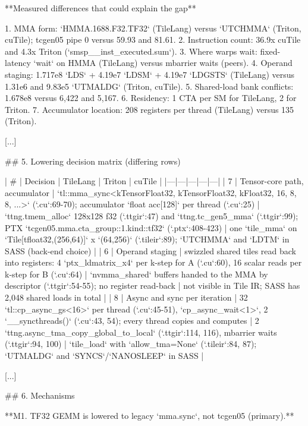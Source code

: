 \begin{promptbox}

**Measured differences that could explain the gap**

1. MMA form: `HMMA.1688.F32.TF32` (TileLang) versus `UTCHMMA` (Triton, cuTile); tcgen05 pipe 0 versus 59.93 and 81.61.
2. Instruction count: 36.9x cuTile and 4.3x Triton (`smsp__inst_executed.sum`).
3. Where warps wait: fixed-latency `wait` on HMMA (TileLang) versus mbarrier waits (peers).
4. Operand staging: 1.717e8 `LDS` + 4.19e7 `LDSM` + 4.19e7 `LDGSTS` (TileLang) versus 1.31e6 and 9.83e5 `UTMALDG` (Triton, cuTile).
5. Shared-load bank conflicts: 1.678e8 versus 6,422 and 5,167.
6. Residency: 1 CTA per SM for TileLang, 2 for Triton.
7. Accumulator location: 208 registers per thread (TileLang) versus 135 (Triton).

[...]

## 5. Lowering decision matrix (differing rows)

| # | Decision | TileLang | Triton | cuTile |
|---|---|---|---|---|
| 7 | Tensor-core path, accumulator | `tl::mma_sync<kTensorFloat32, kTensorFloat32, kFloat32, 16, 8, 8, ...>` (`.cu`:69-70); accumulator `float acc[128]` per thread (`.cu`:25) | `ttng.tmem_alloc` 128x128 f32 (`.ttgir`:47) and `ttng.tc_gen5_mma` (`.ttgir`:99); PTX `tcgen05.mma.cta_group::1.kind::tf32` (`.ptx`:408-423) | one `tile_mma` on `Tile[tfloat32,(256,64)]` x `(64,256)` (`.tileir`:89); `UTCHMMA` and `LDTM` in SASS (back-end choice) |
| 6 | Operand staging | swizzled shared tiles read back into registers: 4 `ptx_ldmatrix_x4` per k-step for A (`.cu`:60), 16 scalar reads per k-step for B (`.cu`:64) | `nvmma_shared` buffers handed to the MMA by descriptor (`.ttgir`:54-55); no register read-back | not visible in Tile IR; SASS has 2,048 shared loads in total |
| 8 | Async and sync per iteration | 32 `tl::cp_async_gs<16>` per thread (`.cu`:45-51), `cp_async_wait<1>`, 2 `__syncthreads()` (`.cu`:43, 54); every thread copies and computes | 2 `ttng.async_tma_copy_global_to_local` (`.ttgir`:114, 116), mbarrier waits (`.ttgir`:94, 100) | `tile_load` with `allow_tma=None` (`.tileir`:84, 87); `UTMALDG` and `SYNCS`/`NANOSLEEP` in SASS |

[...]

## 6. Mechanisms

**M1. TF32 GEMM is lowered to legacy `mma.sync`, not tcgen05 (primary).**


\end{promptbox}
